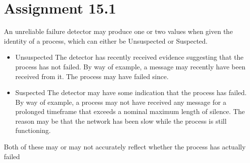 \section{Assignment 15.1}
An unreliable failure detector may  produce one or two values when given the identity of a process, which can either be Unsuspected or Suspected. 

\begin{itemize}
	\item{Unsuspected} The detector has recently received evidence suggesting that the process has not failed. By way of example, a message may recently have been received from it. The process may have failed since.
	
	\item{Suspected} The detector may have some indication that the process has failed. By way of example, a process may not have received any message for a prolonged timeframe that exceeds a nominal maximum length of silence. The reason may be that the network has been slow while the process is still functioning.
\end{itemize}


Both of these may or may not accurately reflect whether the process has actually failed